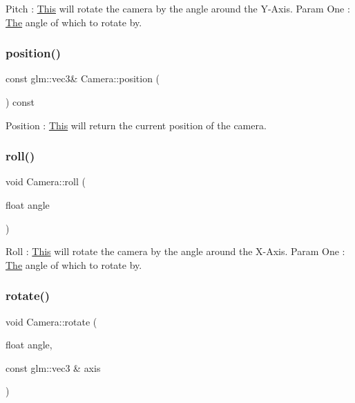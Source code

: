 Pitch \+: \mbox{\hyperlink{class_this}{This}} will rotate the camera by the angle around the Y-\/\+Axis. Param One \+: \mbox{\hyperlink{class_the}{The}} angle of which to rotate by. \mbox{\label{class_camera_a26f5c28317ec7add2a21ddbdc8e463fb}} 
\subsubsection{\texorpdfstring{position()}{position()}}
{\footnotesize\ttfamily const glm\+::vec3\& Camera\+::position (\begin{DoxyParamCaption}{ }\end{DoxyParamCaption}) const\hspace{0.3cm}{\ttfamily [inline]}}

Position \+: \mbox{\hyperlink{class_this}{This}} will return the current position of the camera. \mbox{\label{class_camera_a72be99f88b1cc21122178109d3441818}} 
\subsubsection{\texorpdfstring{roll()}{roll()}}
{\footnotesize\ttfamily void Camera\+::roll (\begin{DoxyParamCaption}\item[{float}]{angle }\end{DoxyParamCaption})\hspace{0.3cm}{\ttfamily [inline]}}

Roll \+: \mbox{\hyperlink{class_this}{This}} will rotate the camera by the angle around the X-\/\+Axis. Param One \+: \mbox{\hyperlink{class_the}{The}} angle of which to rotate by. \mbox{\label{class_camera_a0e6180b5a8da63a999db3de1802c8f4c}} 
\subsubsection{\texorpdfstring{rotate()}{rotate()}\hspace{0.1cm}{\footnotesize\ttfamily [1/2]}}
{\footnotesize\ttfamily void Camera\+::rotate (\begin{DoxyParamCaption}\item[{float}]{angle,  }\item[{const glm\+::vec3 \&}]{axis }\end{DoxyParamCaption})\hspace{0.3cm}{\ttfamily [inline]}}

